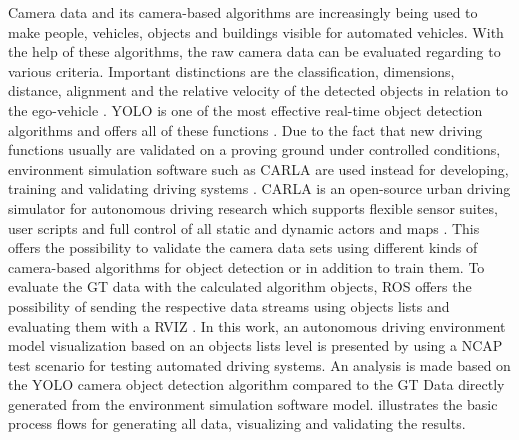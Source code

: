 Camera data and its camera-based algorithms are increasingly being used to make people, vehicles, objects and buildings visible for automated vehicles. With the help of these algorithms, the raw camera data can be evaluated regarding to various criteria. Important distinctions are the classification, dimensions, distance, alignment and the relative velocity of the detected objects in relation to the ego-vehicle \cite{Aeberhard}. \ac{YOLO} is one of the most effective real-time object detection algorithms and offers all of these functions \cite{knuthwebsite}.
Due to the fact that new driving functions usually are validated on a proving ground under controlled conditions, environment simulation software such as CARLA are used instead for developing, training and validating driving systems \cite{Gap}. CARLA is an open-source urban driving simulator for autonomous driving research which supports flexible sensor suites, user scripts and full control of all static and dynamic actors and maps \cite{Dosovitskiy17}. This offers the possibility to validate the camera data sets using different kinds of camera-based algorithms for object detection or in addition to train them. To evaluate the \ac{GT} data with the calculated algorithm objects, \ac{ROS} offers the possibility of sending the respective data streams using objects lists and evaluating them with a \ac{RVIZ} \cite{ROS}.
In this work, an autonomous driving environment model visualization based on an objects lists level is presented by using a NCAP test scenario for testing automated driving systems. An analysis is made based on the \ac{YOLO} camera object detection algorithm compared to the \ac{GT} Data directly generated from the environment simulation software model.  illustrates the basic process flows for generating all data, visualizing and validating the results.

